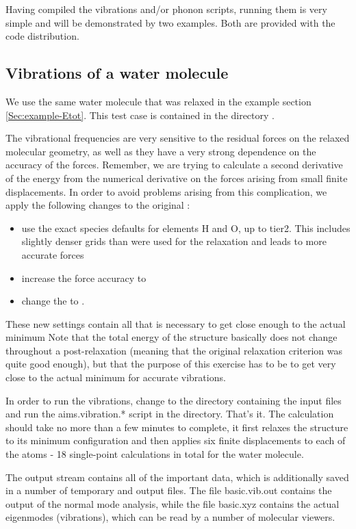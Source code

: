 Having compiled the vibrations and/or phonon scripts, running them is
very simple and will be demonstrated by two examples. Both are
provided with the code distribution.

\subsection*{Vibrations of a water molecule}

We use the same water molecule that was relaxed in the example section
\ref{Sec:example-Etot}. This test case is
contained in the directory .

The vibrational frequencies are very sensitive to the residual forces on the relaxed
molecular geometry, as well as they have a very strong dependence on
the accuracy of the forces. Remember, we are trying to calculate a
second derivative of the energy from the numerical derivative on the
forces arising from small finite displacements. In order to avoid
problems arising from this complication, we apply the following
changes to the original :
\begin{itemize}
\item use the exact species defaults for elements H and O, up to
  tier2. This includes slightly denser grids than were used for the
  relaxation and leads to more accurate forces
\item increase the force accuracy  to
\item change the   to .
\end{itemize}
These new settings contain all that is necessary to get close enough
to the actual minimum 
Note that the total energy of the structure basically does not change
throughout a post-relaxation (meaning that the original relaxation
criterion was quite good enough), but that the purpose of this
exercise has to be to get very close to the actual minimum for
accurate vibrations. 

In order to run the vibrations, change to the directory containing the
input files and run the aims.vibration.* script in the
directory. That's it. The calculation should take no more than a few
minutes to complete, it first relaxes the structure to its minimum
configuration and then applies six finite displacements to each of the
atoms - 18 single-point calculations in total for the water
molecule. 

The output stream contains all of the important data, which is
additionally saved in a number of temporary and output files. The file
basic.vib.out contains the output of the normal mode
analysis, while the file basic.xyz contains the actual eigenmodes
(vibrations), which can be read by a number of molecular viewers. 

